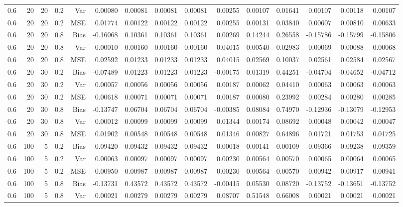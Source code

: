 \begin{table}[!htbp]
\begin{tabular}{lrrrrrrrrrrrrrr}
0.6 &  20 & 20 & 0.2 & Var & 0.00080 & 0.00081 & 0.00081 & 0.00081 & 0.00255 & 0.00107 & 0.01641 & 0.00107 & 0.00118 & 0.00107 \\
0.6 &  20 & 20 & 0.2 & MSE & 0.01774 & 0.00122 & 0.00122 & 0.00122 & 0.00255 & 0.00131 & 0.03840 & 0.00607 & 0.00810 & 0.00633 \\
0.6 &  20 & 20 & 0.8 & Bias & -0.16068 & 0.10361 & 0.10361 & 0.10361 & 0.00269 & 0.14244 & 0.26558 & -0.15786 & -0.15799 & -0.15806 \\
0.6 &  20 & 20 & 0.8 & Var & 0.00010 & 0.00160 & 0.00160 & 0.00160 & 0.04015 & 0.00540 & 0.02983 & 0.00069 & 0.00088 & 0.00068 \\
0.6 &  20 & 20 & 0.8 & MSE & 0.02592 & 0.01233 & 0.01233 & 0.01233 & 0.04015 & 0.02569 & 0.10037 & 0.02561 & 0.02584 & 0.02567 \\
0.6 &  20 & 30 & 0.2 & Bias & -0.07489 & 0.01223 & 0.01223 & 0.01223 & -0.00175 & 0.01319 & 0.44251 & -0.04704 & -0.04652 & -0.04712 \\
0.6 &  20 & 30 & 0.2 & Var & 0.00057 & 0.00056 & 0.00056 & 0.00056 & 0.00187 & 0.00062 & 0.04410 & 0.00063 & 0.00063 & 0.00063 \\
0.6 &  20 & 30 & 0.2 & MSE & 0.00618 & 0.00071 & 0.00071 & 0.00071 & 0.00187 & 0.00080 & 0.23992 & 0.00284 & 0.00280 & 0.00285 \\
0.6 &  20 & 30 & 0.8 & Bias & -0.13747 & 0.06704 & 0.06704 & 0.06704 & -0.00385 & 0.08084 & 0.74970 & -0.12936 & -0.13079 & -0.12953 \\
0.6 &  20 & 30 & 0.8 & Var & 0.00012 & 0.00099 & 0.00099 & 0.00099 & 0.01344 & 0.00174 & 0.08692 & 0.00048 & 0.00042 & 0.00047 \\
0.6 &  20 & 30 & 0.8 & MSE & 0.01902 & 0.00548 & 0.00548 & 0.00548 & 0.01346 & 0.00827 & 0.64896 & 0.01721 & 0.01753 & 0.01725 \\
0.6 & 100 &  5 & 0.2 & Bias & -0.09420 & 0.09432 & 0.09432 & 0.09432 & 0.00018 & 0.00141 & 0.00109 & -0.09366 & -0.09238 & -0.09359 \\
0.6 & 100 &  5 & 0.2 & Var & 0.00063 & 0.00097 & 0.00097 & 0.00097 & 0.00230 & 0.00564 & 0.00570 & 0.00065 & 0.00064 & 0.00065 \\
0.6 & 100 &  5 & 0.2 & MSE & 0.00950 & 0.00987 & 0.00987 & 0.00987 & 0.00230 & 0.00564 & 0.00570 & 0.00942 & 0.00917 & 0.00941 \\
0.6 & 100 &  5 & 0.8 & Bias & -0.13731 & 0.43572 & 0.43572 & 0.43572 & -0.00415 & 0.05530 & 0.08720 & -0.13752 & -0.13651 & -0.13752 \\
0.6 & 100 &  5 & 0.8 & Var & 0.00021 & 0.00279 & 0.00279 & 0.00279 & 0.08707 & 0.51548 & 0.66008 & 0.00021 & 0.00021 & 0.00021 \\

\end{tabular}
\end{table}
